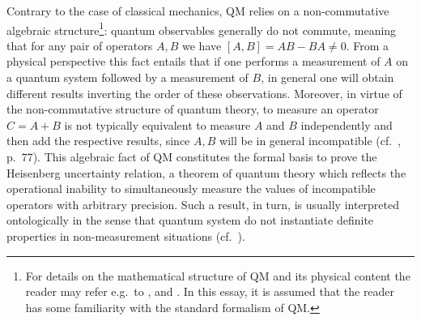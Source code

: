 \documentclass[11pt, executivepaper]{article}
\begin{document}
Contrary to the case of classical mechanics, QM relies on a non-commutative algebraic structure\footnote{For details on the mathematical structure of QM and its physical content the reader may refer e.g.\ to \cite{Sakurai1994}, and \cite{Griffiths:2014}. In this essay, it is assumed that the reader has some familiarity with the standard formalism of QM.}: quantum observables generally do not commute, meaning that for any pair of operators $A,B$ we have $[A,B]=AB-BA\neq0$. From a physical perspective this fact entails that if one performs a measurement of $A$ on a quantum system followed by a measurement of $B$, in general one will obtain different results inverting the order of these observations. Moreover, in virtue of the non-commutative structure of quantum theory, to measure an operator $C=A+B$ is not typically equivalent to measure $A$ and $B$ independently and then add the respective results, since $A,B$ will be in general incompatible (cf.\ \cite{David:2015}, p.\ 77). This algebraic fact of QM constitutes the formal basis to prove the Heisenberg uncertainty relation, a theorem of quantum theory which reflects the operational inability to simultaneously measure the values of incompatible operators with arbitrary precision. Such a result, in turn, is usually interpreted ontologically in the sense that quantum system do not instantiate definite properties in non-measurement situations (cf.\ \cite{Sakurai1994}).
\end{document}
